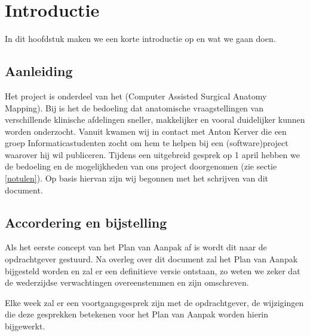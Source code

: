 \section{Introductie}


In dit hoofdstuk maken we een korte introductie op \casam en wat we gaan doen. 
 
\subsection{Aanleiding}


Het project is onderdeel van het \casamproject (Computer Assisted Surgical Anatomy Mapping). 
Bij \casam is het de bedoeling dat anatomische vraagstellingen van verschillende klinische afdelingen sneller, makkelijker en vooral duidelijker kunnen worden onderzocht.
Vanuit \casam kwamen wij in contact met Anton Kerver die een groep Informaticastudenten zocht om hem te helpen bij een (software)project waarover hij wil publiceren. 
Tijdens een uitgebreid gesprek op 1 april hebben we de bedoeling en de mogelijkheden van ons project doorgenomen (zie sectie \ref{notulen}).
Op basis hiervan zijn wij begonnen met het schrijven van dit document.
\subsection{Accordering en bijstelling}


Als het eerste concept van het Plan van Aanpak af is wordt dit naar de opdrachtgever gestuurd.
Na overleg over dit document zal het Plan van Aanpak bijgesteld worden en zal er een definitieve versie ontstaan, zo weten we zeker dat de wederzijdse verwachtingen overeenstemmen en zijn omschreven. 

Elke week zal er een voortgangsgesprek zijn met de opdrachtgever, de wijzigingen die deze gesprekken betekenen voor het Plan van Aanpak worden hierin bijgewerkt.

